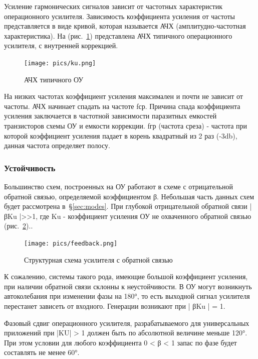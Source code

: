 \documentclass[a4paper,12pt,oneside]{scrartcl}
\begin{document}
Усиление гармонических сигналов зависит от частотных характеристик операционного усилителя. Зависимость коэффициента усиления от частоты представляется в виде кривой, которая называется АЧХ (амплитудно-частотная характеристика).
На (рис.~\ref{fig:Ku}) представлена АЧХ типичного операционного усилителя,  с внутренней коррекцией.

\begin{figure}[!htb]
\centering
\texttt{[image: pics/ku.png]}
\caption{АЧХ типичного ОУ}
\label{fig:Ku}
\end{figure}

На низких частотах коэффициент усиления максимален и почти не зависит от частоты. АЧХ начинает спадать на частоте fср. Причина спада коэффициента усиления заключается в частотной зависимости паразитных емкостей транзисторов схемы ОУ и емкости коррекции. fгр (частота среза) - частота при которой коэффициент усиления падает в корень квадратный из 2 раз (-3db), данная частота определяет полосу.~\cite{B5}





\subsubsection{Устойчивость}\label{sec:stability}

Большинство схем, построенных на ОУ работают в схеме с отрицательной обратной связью, определяемой коэффициентом β. Небольшая часть данных схем будет рассмотрена в~§\ref{sec:modes}. При глубокой отрицательной обратной связи  | βKu |>>1, где Ku - коэффициент усиления ОУ не охваченного обратной связью (рис.~\ref{fig:Feed})..~\cite{B7}

\begin{figure}[!htb]
\centering
\texttt{[image: pics/feedback.png]}
\caption{Структурная схема усилителя с обратной связью}
\label{fig:Feed}
\end{figure}

К сожалению, системы такого рода, имеющие большой коэффициент усиления, при наличии обратной связи склонны к неустойчивости. В ОУ могут возникнуть автоколебания при изменении фазы на 180°, то есть выходной сигнал усилителя перестанет зависеть от входного. Генерации возникают при | βKu | = 1.

Фазовый сдвиг операционного усилителя, разрабатываемого для универсальных приложений при |KU|  > 1 должен быть по абсолютной величине меньше 120°. При этом условии для любого коэффициента 0 < β < 1  запас по фазе будет составлять не менее 60°.~\cite{B7} 
\end{document}
